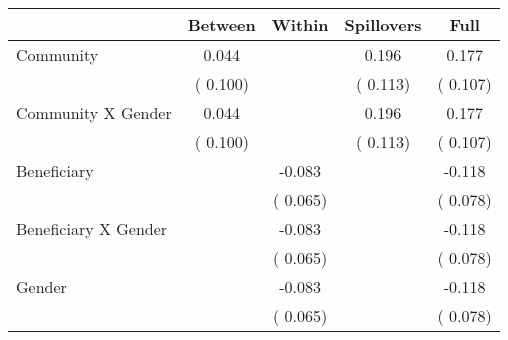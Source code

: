 
\begin{tabular}{l*{4}{c}}\hline&\multicolumn{1}{c}{Between}&\multicolumn{1}{c}{Within}&\multicolumn{1}{c}{Spillovers}&\multicolumn{1}{c}{Full}\\ \hline
 Community                                     &              0.044      &                                               &        0.196 &         0.177                            \\ 
                                                       &        (       0.100)           &                                       &       (       0.113)     &      (       0.107)                                           \\ 
 Community X Gender            &              0.044      &                                               &        0.196 &         0.177                            \\ 
                                                       &        (       0.100)           &                                       &       (       0.113)     &      (       0.107)                                           \\ 
 Beneficiary                           &                                               &       -0.083    &                                &            -0.118                            \\ 
                                                       &                                               & (       0.065)                  &                                        &      (       0.078)                                           \\ 
 Beneficiary X Gender          &                                               &       -0.083    &                                &            -0.118                            \\ 
                                                       &                                               & (       0.065)                  &                                        &      (       0.078)                                           \\ 
 Gender                                        &                              &       -0.083    &                                &            -0.118                            \\ 
                                                       &                                               & (       0.065)                  &                                        &      (       0.078)                                           \\ 

\end{tabular}
